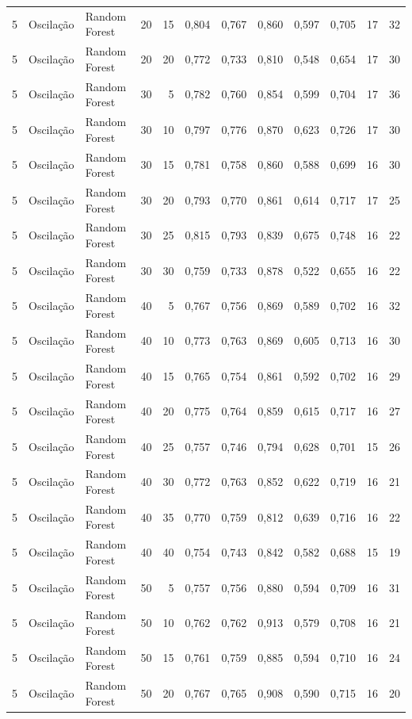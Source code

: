 \begin{longtable}{@{}rllrrrrrrrrr@{}}
5 & Oscilação & Random Forest & 20 & 15 & 0,804 & 0,767 & 0,860 & 0,597 & 0,705 & 17 & 32 \\
5 & Oscilação & Random Forest & 20 & 20 & 0,772 & 0,733 & 0,810 & 0,548 & 0,654 & 17 & 30 \\
5 & Oscilação & Random Forest & 30 & 5 & 0,782 & 0,760 & 0,854 & 0,599 & 0,704 & 17 & 36 \\
5 & Oscilação & Random Forest & 30 & 10 & 0,797 & 0,776 & 0,870 & 0,623 & 0,726 & 17 & 30 \\
5 & Oscilação & Random Forest & 30 & 15 & 0,781 & 0,758 & 0,860 & 0,588 & 0,699 & 16 & 30 \\
5 & Oscilação & Random Forest & 30 & 20 & 0,793 & 0,770 & 0,861 & 0,614 & 0,717 & 17 & 25 \\
5 & Oscilação & Random Forest & 30 & 25 & 0,815 & 0,793 & 0,839 & 0,675 & 0,748 & 16 & 22 \\
5 & Oscilação & Random Forest & 30 & 30 & 0,759 & 0,733 & 0,878 & 0,522 & 0,655 & 16 & 22 \\
5 & Oscilação & Random Forest & 40 & 5 & 0,767 & 0,756 & 0,869 & 0,589 & 0,702 & 16 & 32 \\
5 & Oscilação & Random Forest & 40 & 10 & 0,773 & 0,763 & 0,869 & 0,605 & 0,713 & 16 & 30 \\
5 & Oscilação & Random Forest & 40 & 15 & 0,765 & 0,754 & 0,861 & 0,592 & 0,702 & 16 & 29 \\
5 & Oscilação & Random Forest & 40 & 20 & 0,775 & 0,764 & 0,859 & 0,615 & 0,717 & 16 & 27 \\
5 & Oscilação & Random Forest & 40 & 25 & 0,757 & 0,746 & 0,794 & 0,628 & 0,701 & 15 & 26 \\
5 & Oscilação & Random Forest & 40 & 30 & 0,772 & 0,763 & 0,852 & 0,622 & 0,719 & 16 & 21 \\
5 & Oscilação & Random Forest & 40 & 35 & 0,770 & 0,759 & 0,812 & 0,639 & 0,716 & 16 & 22 \\
5 & Oscilação & Random Forest & 40 & 40 & 0,754 & 0,743 & 0,842 & 0,582 & 0,688 & 15 & 19 \\
5 & Oscilação & Random Forest & 50 & 5 & 0,757 & 0,756 & 0,880 & 0,594 & 0,709 & 16 & 31 \\
5 & Oscilação & Random Forest & 50 & 10 & 0,762 & 0,762 & 0,913 & 0,579 & 0,708 & 16 & 21 \\
5 & Oscilação & Random Forest & 50 & 15 & 0,761 & 0,759 & 0,885 & 0,594 & 0,710 & 16 & 24 \\
5 & Oscilação & Random Forest & 50 & 20 & 0,767 & 0,765 & 0,908 & 0,590 & 0,715 & 16 & 20 \\

\end{longtable}
